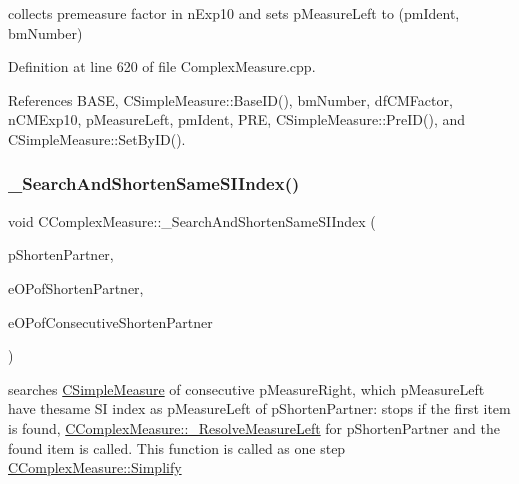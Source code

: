 collects premeasure factor in n\+Exp10 and sets p\+Measure\+Left to (pm\+Ident, bm\+Number) 



Definition at line 620 of file Complex\+Measure.\+cpp.



References B\+A\+SE, C\+Simple\+Measure\+::\+Base\+I\+D(), bm\+Number, df\+C\+M\+Factor, n\+C\+M\+Exp10, p\+Measure\+Left, pm\+Ident, P\+RE, C\+Simple\+Measure\+::\+Pre\+I\+D(), and C\+Simple\+Measure\+::\+Set\+By\+I\+D().

\mbox{\label{classCComplexMeasure_ac9bdfda3d2175532ba7e1f425e6b23b1}} 
\subsubsection{\texorpdfstring{\+\_\+\+Search\+And\+Shorten\+Same\+S\+I\+Index()}{\_SearchAndShortenSameSIIndex()}}
{\footnotesize\ttfamily void C\+Complex\+Measure\+::\+\_\+\+Search\+And\+Shorten\+Same\+S\+I\+Index (\begin{DoxyParamCaption}\item[{\hyperlink{classCComplexMeasure}{C\+Complex\+Measure} $\ast$}]{p\+Shorten\+Partner,  }\item[{\hyperlink{MeasureOperator_8h_a1431c79e3ad4b4c5bcc9f31f188538f2}{e\+Operation} \&}]{e\+O\+Pof\+Shorten\+Partner,  }\item[{\hyperlink{MeasureOperator_8h_a1431c79e3ad4b4c5bcc9f31f188538f2}{e\+Operation} \&}]{e\+O\+Pof\+Consecutive\+Shorten\+Partner }\end{DoxyParamCaption})\hspace{0.3cm}{\ttfamily [protected]}}



searches \hyperlink{classCSimpleMeasure}{C\+Simple\+Measure} of consecutive p\+Measure\+Right, which p\+Measure\+Left have thesame SI index as p\+Measure\+Left of p\+Shorten\+Partner\+: stops if the first item is found, \hyperlink{classCComplexMeasure_a8f642a3a0044d4dc0492774bca8666e9}{C\+Complex\+Measure\+::\+\_\+\+Resolve\+Measure\+Left} for p\+Shorten\+Partner and the found item is called. This function is called as one step \hyperlink{classCComplexMeasure_addb4e69033f2c32fb3bf4a3aef5e1470}{C\+Complex\+Measure\+::\+Simplify} 


